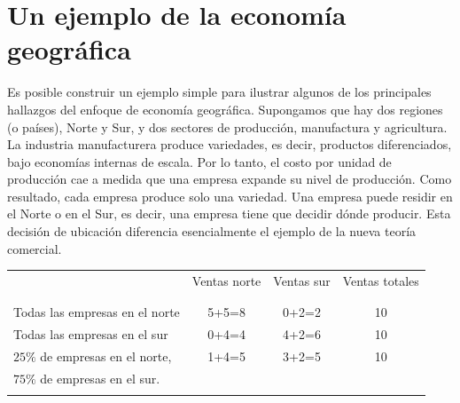 \section{Un ejemplo de la economía geográfica}
Es posible construir un ejemplo simple para ilustrar algunos de los principales hallazgos del enfoque de economía geográfica. Supongamos que hay dos regiones (o países), Norte y Sur, y dos sectores de producción, manufactura y agricultura. La industria manufacturera produce variedades, es decir, productos diferenciados, bajo economías internas de escala. Por lo tanto, el costo por unidad de producción cae a medida que una empresa expande su nivel de producción. Como resultado, cada empresa produce solo una variedad. Una empresa puede residir en el Norte o en el Sur, es decir, una empresa tiene que decidir dónde producir. Esta decisión de ubicación diferencia esencialmente el ejemplo de la nueva teoría comercial.\\
\begin{center}
\begin{tabular}{lccc}
    &Ventas norte&Ventas sur& Ventas totales\\\\
    \hline\\
    Todas las empresas en el norte & 5+5=8 & 0+2=2 & 10\\
    Todas las empresas en el sur & 0+4=4 & 4+2=6 & 10\\
    $25\%$ de empresas en el norte, & 1+4=5 & 3+2=5 & 10\\
    $75\%$ de empresas en el sur. & & & \\\\
\end{tabular}
\end{center}

